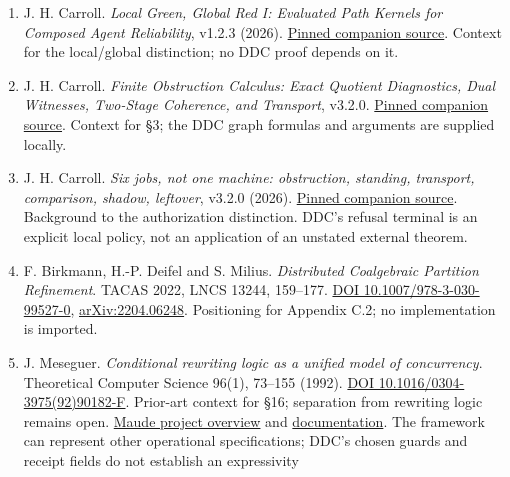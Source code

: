\documentclass[
  11pt,
]{article}
\providecommand{\tightlist}{%
  \setlength{\itemsep}{0pt}\setlength{\parskip}{0pt}}
\renewcommand{\_}{\ddcunderscore\allowbreak}
\begin{document}
\begin{enumerate}
\def\labelenumi{\arabic{enumi}.}
\tightlist
\item
  J. H. Carroll. \emph{Local Green, Global Red I: Evaluated Path Kernels
  for Composed Agent Reliability}, v1.2.3 (2026).
  \href{https://github.com/dbccpage/the_symbol_game/blob/e4a1214bb3e47570b0f74ecc9117c98f27a26b5e/omega_engine_atlas/coda_atlas/F004_papers/001_finite_obstruction_calculus/012_local_green_global_red_foundational_series/lggr_i_evaluated_path_kernels/lggr_i_evaluated_path_kernels.md}{Pinned
  companion source}. Context for the local/global distinction; no DDC
  proof depends on it.
\item
  J. H. Carroll. \emph{Finite Obstruction Calculus: Exact Quotient
  Diagnostics, Dual Witnesses, Two-Stage Coherence, and Transport},
  v3.2.0.
  \href{https://github.com/dbccpage/the_symbol_game/blob/e4a1214bb3e47570b0f74ecc9117c98f27a26b5e/omega_engine_atlas/coda_atlas/F005_coda/foc/coda_foc.md}{Pinned
  companion source}. Context for §3; the DDC graph formulas and
  arguments are supplied locally.
\item
  J. H. Carroll. \emph{Six jobs, not one machine: obstruction, standing,
  transport, comparison, shadow, leftover}, v3.2.0 (2026).
  \href{https://github.com/dbccpage/the_symbol_game/blob/e4a1214bb3e47570b0f74ecc9117c98f27a26b5e/omega_engine_atlas/coda_atlas/F005_coda/coda_gtla/coda_gtla_monograph.md}{Pinned
  companion source}. Background to the authorization distinction. DDC's
  refusal terminal is an explicit local policy, not an application of an
  unstated external theorem.
\item
  F. Birkmann, H.-P. Deifel and S. Milius. \emph{Distributed Coalgebraic
  Partition Refinement}. TACAS 2022, LNCS 13244, 159--177.
  \href{https://doi.org/10.1007/978-3-030-99527-0_9}{DOI
  10.1007/978-3-030-99527-0\_9},
  \href{https://arxiv.org/abs/2204.06248}{arXiv:2204.06248}. Positioning
  for Appendix C.2; no implementation is imported.
\item
  J. Meseguer. \emph{Conditional rewriting logic as a unified model of
  concurrency}. Theoretical Computer Science 96(1), 73--155 (1992).
  \href{https://doi.org/10.1016/0304-3975(92)90182-F}{DOI
  10.1016/0304-3975(92)90182-F}. Prior-art context for §16; separation
  from rewriting logic remains open.
  \href{https://maude.cs.illinois.edu/overview}{Maude project overview}
  and \href{https://maude.cs.illinois.edu/documentation}{documentation}.
  The framework can represent other operational specifications; DDC's
  chosen guards and receipt fields do not establish an expressivity

\end{enumerate}
\end{document}
